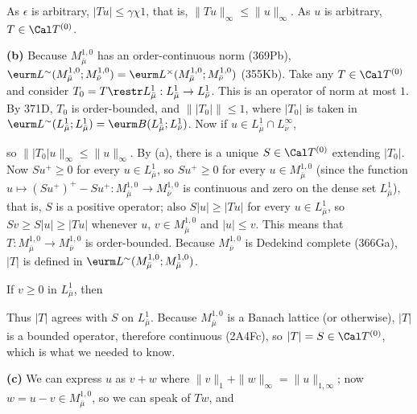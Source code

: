 {\noindent As $\epsilon$ is arbitrary, $|Tu|\le\gamma\chi 1$, that
is, $\|Tu\|_{\infty}\le\|u\|_{\infty}$.   As $u$ is arbitrary,
$T\in\Cal T^{(0)}$.

\medskip

{\bf (b)} Because $M^{1,0}_{\bar\mu}$ has an order-continuous norm
(369Pb), $\eurm L^{\sim}(M^{1,0}_{\bar\mu};M^{1,0}_{\bar\nu})
=\eurm L^{\times}(M^{1,0}_{\bar\mu};M^{1,0}_{\bar\nu})$ (355Kb).   Take
any $T\in\Cal T^{(0)}$ and consider
$T_0=T\restr L^1_{\bar\mu}:L^1_{\bar\mu}\to L^1_{\bar\nu}$.   This is an
operator of norm at most $1$.   By
371D, $T_0$ is order-bounded, and $\||T_0|\|\le 1$, where $|T_0|$
is taken in $\eurm L^{\sim}(L^1_{\bar\mu};L^1_{\bar\mu})
=\eurm B(L^1_{\bar\mu};L^1_{\bar\nu})$.   Now if
$u\in L^1_{\bar\mu}\cap L^{\infty}_{\bar\nu}$,


\noindent so $\||T_0|u\|_{\infty}\le\|u\|_{\infty}$.   By (a), there is
a unique $S\in\Cal T^{(0)}$ extending $|T_0|$.   Now $Su^+\ge 0$ for
every $u\in L^1_{\bar\mu}$, so $Su^+\ge 0$ for every
$u\in M^{1,0}_{\bar\mu}$ (since the function
$u\mapsto (Su^+)^+-Su^+:M^{1,0}_{\bar\mu}\to M^{1,0}_{\bar\nu}$ is
continuous and zero on the dense set $L^1_{\bar\mu}$), that is, $S$ is a
positive operator;  also $S|u|\ge|Tu|$ for every $u\in L^1_{\bar\mu}$,
so $Sv\ge S|u|\ge|Tu|$ whenever $u$, $v\in M^{1,0}_{\bar\mu}$ and
$|u|\le v$.   This means
that $T:M^{1,0}_{\bar\mu}\to M^{1,0}_{\bar\nu}$ is order-bounded.
Because $M^{1,0}_{\bar\nu}$ is
Dedekind complete (366Ga), $|T|$ is defined in
$\eurm L^{\sim}(M^{1,0}_{\bar\mu};M^{1,0}_{\bar\mu})$.

If $v\ge 0$ in $L^1_{\bar\mu}$, then


\noindent Thus $|T|$ agrees with $S$ on $L^1_{\bar\mu}$.   Because
$M^{1,0}_{\bar\mu}$ is a
Banach lattice (or otherwise), $|T|$ is a bounded operator, therefore
continuous (2A4Fc), so $|T|=S\in\Cal T^{(0)}$, which is what we needed
to know.

\medskip

{\bf (c)} We can express $u$ as $v+w$ where
$\|v\|_1+\|w\|_{\infty}=\|u\|_{1,\infty}$;  now
$w=u-v\in M^{1,0}_{\bar\mu}$, so we can speak of $Tw$, and


}
